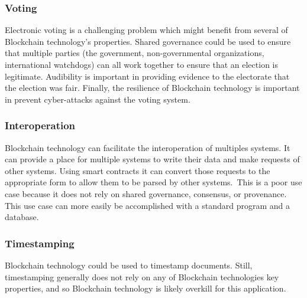 \subsubsection{Voting}
Electronic voting is a challenging problem which might benefit from several of Blockchain technology's properties.
Shared governance could be used to ensure that multiple parties (the government, non-governmental organizations, international watchdogs) can all work together to ensure that an election is legitimate.
Audibility is important in providing evidence to the electorate that the election was fair.
Finally, the resilience of Blockchain technology is important in prevent cyber-attacks against the voting system.

\subsubsection{Interoperation}
Blockchain technology can facilitate the interoperation of multiples systems.
It can provide a place for multiple systems to write their data and make requests of other systems.
Using smart contracts it can convert those requests to the appropriate form to allow them to be parsed by other systems.\
This is a poor use case because it does not rely on shared governance, consensus, or provenance.
This use case can more easily be accomplished with a standard program and a database.



\subsubsection{Timestamping}
Blockchain technology could be used to timestamp documents. Still, timestamping generally does not rely on any of Blockchain technologies key properties, and so Blockchain technology is likely overkill for this application.